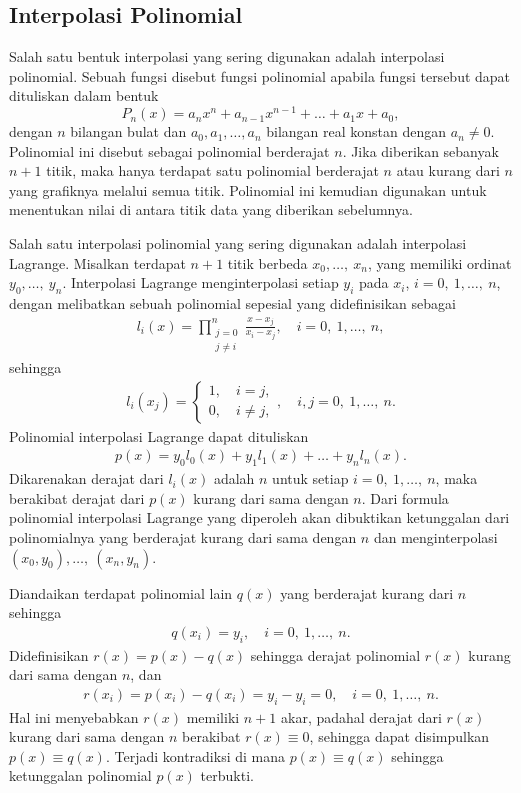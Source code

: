 \subsection{Interpolasi Polinomial}
Salah satu bentuk interpolasi yang sering digunakan adalah interpolasi polinomial. Sebuah fungsi disebut fungsi polinomial apabila fungsi tersebut dapat dituliskan dalam bentuk
$$ P_n(x) = a_nx^n + a_{n-1}x^{n-1} + \dots + a_1x + a_0,$$
dengan $ n $ bilangan bulat dan $ a_0,a_1,\dots,a_n $ bilangan real konstan dengan $ a_n \neq 0 $. Polinomial ini disebut sebagai polinomial berderajat $n$. Jika diberikan sebanyak $ n+1 $ titik, maka hanya terdapat satu polinomial berderajat $ n $ atau kurang dari $ n $ yang grafiknya melalui semua titik. Polinomial ini kemudian digunakan untuk menentukan nilai di antara titik data yang diberikan sebelumnya.

Salah satu interpolasi polinomial yang sering digunakan adalah interpolasi Lagrange. Misalkan terdapat $n+1$ titik berbeda $x_0,\dots,~x_n$, yang memiliki ordinat $y_0,\dots,~y_n$. Interpolasi Lagrange menginterpolasi setiap $y_i$ pada $x_i$, $i=0,~1,\dots,~n$, dengan melibatkan sebuah polinomial sepesial yang didefinisikan sebagai
\begin{align*}
    l_i(x)=\prod_{\substack{j=0\\j\neq i}}^n\frac{x-x_j}{x_i - x_j}, \quad i=0,~1,\dots,~n,
\end{align*}
sehingga
\begin{align*}
    l_i(x_j) = \begin{cases}
        1, \quad i=j,\\
        0, \quad i\neq j,
    \end{cases}, \quad i,j=0,~1,\dots, ~n.
\end{align*}
Polinomial interpolasi Lagrange dapat dituliskan
\begin{align}\label{interpolasiLagrange}
    p(x) = y_0l_0(x)+y_1l_1(x) + \dots + y_nl_n(x).
\end{align}
Dikarenakan derajat dari $l_i(x)$ adalah $n$ untuk setiap $i=0,~1,\dots,~n$, maka berakibat derajat dari $p(x)$ kurang dari sama dengan $n$. Dari formula polinomial interpolasi Lagrange yang diperoleh akan dibuktikan ketunggalan dari polinomialnya yang berderajat kurang dari sama dengan $n$ dan menginterpolasi $(x_0,y_0),\dots,~(x_n,y_n)$.

Diandaikan terdapat polinomial lain $q(x)$ yang berderajat kurang dari $n$ sehingga
\begin{align*}
    q(x_i) = y_i, \quad i = 0, ~1, \dots, ~n.
\end{align*}
Didefinisikan $r(x)=p(x)-q(x)$ sehingga derajat polinomial $r(x)$ kurang dari sama dengan $n$, dan
\begin{align*}
    r(x_i) = p(x_i) - q(x_i) = y_i - y_i = 0, \quad i = 0, ~1, \dots, ~n.
\end{align*}
Hal ini menyebabkan $r(x)$ memiliki $n+1$ akar, padahal derajat dari $r(x)$ kurang dari sama dengan $n$ berakibat $r(x) \equiv 0$, sehingga dapat disimpulkan $p(x) \equiv q(x)$. Terjadi kontradiksi di mana $p(x) \equiv q(x)$ sehingga ketunggalan polinomial $p(x)$ terbukti.

